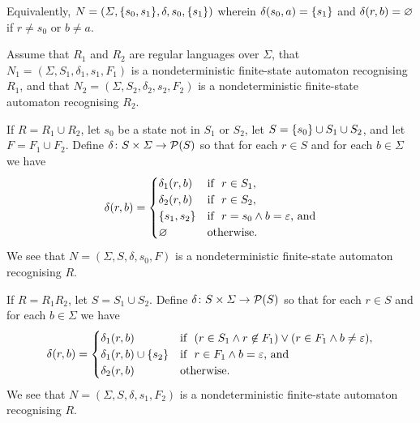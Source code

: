     \noindent Equivalently, \(N = (\varSigma, \{s_0, s_1\}, \delta, s_0,
    \{s_1\})\) wherein \(\delta(s_0, a) = \{s_1\}\) and \(\delta(r, b) =
    \varnothing\) if \(r \neq s_0\) or \(b \neq a\).

    Assume that \(R_1\) and \(R_2\) are regular languages over \(\varSigma\),
    that \(N_1 = (\varSigma, S_1, \delta_1, s_1, F_1)\) is a nondeterministic
    finite-state automaton recognising \(R_1\), and that \(N_2 = (\varSigma,
    S_2, \delta_2, s_2, F_2)\) is a nondeterministic finite-state automaton
    recognising \(R_2\).

    If \(R = R_1 \cup R_2\), let \(s_0\) be a state not in \(S_1\) or \(S_2\),
    let \(S = \{s_0\} \cup S_1 \cup S_2\), and let \(F = F_1 \cup F_2\).
    Define \(\delta\colon S \times \varSigma\to\mathcal{P}(S)\) so that for each \(r
    \in S\) and for each \(b \in \varSigma\) we have
    \[
        \delta(r, b) = \begin{cases}
            \delta_1(r, b) & \text{if }\ r \in S_1,\\
            \delta_2(r, b) & \text{if }\ r \in S_2,\\
            \{s_1, s_2\} & \text{if }\ r = s_0 \land b = \varepsilon \text{,
            and}\\
            \varnothing & \text{otherwise.}
        \end{cases}
    \]
    We see that \(N = (\varSigma, S, \delta, s_0, F)\) is a nondeterministic
    finite-state automaton recognising \(R\).

    If \(R = R_1 R_2\), let \(S = S_1 \cup S_2\). Define \(\delta\colon S \times
    \varSigma\to\mathcal{P}(S)\) so that for each \(r \in S\) and for each \(b \in
    \varSigma\) we have
    \[
        \delta(r, b) = \begin{cases}
            \delta_1(r, b) & \text{if }\ (r \in S_1 \land r \not\in F_1) \lor (r
            \in F_1 \land b \neq \varepsilon),\\
            \delta_1(r, b) \cup \{s_2\} & \text{if }\ r \in F_1 \land b =
            \varepsilon \text{, and}\\
            \delta_2(r, b) & \text{otherwise.}
        \end{cases}
    \]
    We see that \(N = (\varSigma, S, \delta, s_1, F_2)\) is a nondeterministic
    finite-state automaton recognising \(R\).

